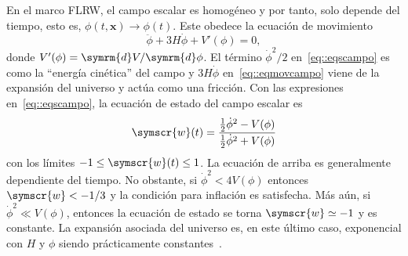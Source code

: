 En el marco FLRW, el campo escalar es homogéneo y por tanto, solo depende del tiempo, esto es, \(\phi\left(t,\symbf{x}\right)\rightarrow\phi(t)\). Este obedece la ecuación de movimiento
\begin{equation}
    \ddot{\phi}+3H\dot{\phi}+V'(\phi)=0,\label{eq::eqmovcampo}
\end{equation}
donde \(V'(\phi)=\symrm{d}V/\symrm{d}\phi\). El término \(\dot{\phi}^2/2\) en~\eqref{eq::eqscampo} es como la ``energía cinética'' del campo y \(3H\dot{\phi}\) en~\eqref{eq::eqmovcampo} viene de la expansión del universo y actúa como una fricción. Con las expresiones en~\eqref{eq::eqscampo}, la ecuación de estado del campo escalar es
\begin{equation}
    \symscr{w}(t)=\frac{\frac{1}{2}\dot{\phi}^2-V(\phi)}{\frac{1}{2}\dot{\phi}^2+V(\phi)}\label{eq::estado}
\end{equation}
con los límites \(-1\leq\symscr{w}(t)\leq 1\). La ecuación de arriba es generalmente dependiente del tiempo. No obstante, si \(\dot{\phi}^2<4V(\phi)\) entonces \(\symscr{w} < -1/3\) y la condición para inflación es satisfecha. Más aún, si \(\dot{\phi}^2 \ll V(\phi)\), entonces la ecuación de estado se torna \(\symscr{w}\simeq -1\) y es constante. La expansión asociada del universo es, en este último caso, exponencial con \(H\) y \(\phi\) siendo prácticamente constantes~\cite{knobel2012introduction}.
